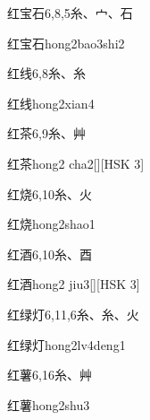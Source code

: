 \begin{entry}{红宝石}{6,8,5}{⽷、⼧、⽯}
  \begin{phonetics}{红宝石}{hong2bao3shi2}
  \end{phonetics}
\end{entry}

\begin{entry}{红线}{6,8}{⽷、⽷}
  \begin{phonetics}{红线}{hong2xian4}
  \end{phonetics}
\end{entry}

\begin{entry}{红茶}{6,9}{⽷、⾋}
  \begin{phonetics}{红茶}{hong2 cha2}[][HSK 3]
  \end{phonetics}
\end{entry}

\begin{entry}{红烧}{6,10}{⽷、⽕}
  \begin{phonetics}{红烧}{hong2shao1}
  \end{phonetics}
\end{entry}

\begin{entry}{红酒}{6,10}{⽷、⾣}
  \begin{phonetics}{红酒}{hong2 jiu3}[][HSK 3]
  \end{phonetics}
\end{entry}

\begin{entry}{红绿灯}{6,11,6}{⽷、⽷、⽕}
  \begin{phonetics}{红绿灯}{hong2lv4deng1}
  \end{phonetics}
\end{entry}

\begin{entry}{红薯}{6,16}{⽷、⾋}
  \begin{phonetics}{红薯}{hong2shu3}
  \end{phonetics}
\end{entry}

